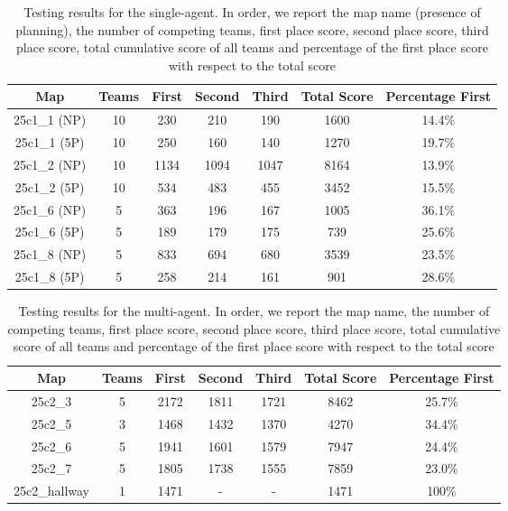 \begin{table}[H]
    \centering
    \begin{tabular}{|c|c|c|c|c|c|c|}
        \hline
        Map & Teams & First & Second & Third & Total Score & Percentage First \\
        \hline
        25c1\_1 (NP)  & 10   & 230   & 210   & 190  & 1600  & 14.4\% \\
        25c1\_1 (5P)  & 10   & 250   & 160   & 140  & 1270  & 19.7\% \\
        25c1\_2 (NP)  & 10  & 1134  & 1094  & 1047  & 8164  & 13.9\% \\
        25c1\_2 (5P)  & 10   & 534   & 483   & 455  & 3452  & 15.5\% \\
        25c1\_6 (NP)   & 5   & 363   & 196   & 167  & 1005  & 36.1\% \\
        25c1\_6 (5P)   & 5   & 189   & 179   & 175   & 739  & 25.6\% \\
        25c1\_8 (NP)   & 5   & 833   & 694   & 680  & 3539  & 23.5\% \\
        25c1\_8 (5P)   & 5   & 258   & 214   & 161   & 901  & 28.6\% \\
        \hline
    \end{tabular}
    \caption{Testing results for the single-agent. In order, we report the map name (presence of planning), the number of competing teams, first place score, second place score, third place score, total cumulative score of all teams and percentage of the first place score with respect to the total score}
    \label{tab:table_1}
\end{table}

\begin{table}[H]
    \centering
    \begin{tabular}{|c|c|c|c|c|c|c|}
        \hline
        Map & Teams & First & Second & Third & Total Score & Percentage First \\
        \hline
        25c2\_3         & 5  & 2172   & 1811  & 1721  & 8462  & 25.7\% \\
        25c2\_5         & 3  & 1468   & 1432  & 1370  & 4270  & 34.4\% \\
        25c2\_6         & 5  & 1941   & 1601  & 1579  & 7947  & 24.4\% \\
        25c2\_7         & 5  & 1805   & 1738  & 1555  & 7859  & 23.0\% \\
        25c2\_hallway   & 1  & 1471   & -     & -     & 1471   & 100\% \\
        \hline
    \end{tabular}
    \caption{Testing results for the multi-agent. In order, we report the map name, the number of competing teams, first place score, second place score, third place score, total cumulative score of all teams and percentage of the first place score with respect to the total score}
    \label{tab:table_2}
\end{table}